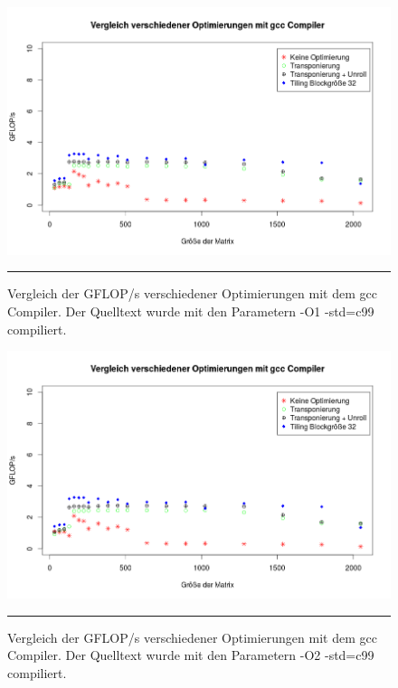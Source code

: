 \begin{figure}[h]
\includegraphics[scale = 0.45]{Bilder/GgccO1.png}
\caption{Vergleich der GFLOP/s verschiedener Optimierungen mit dem gcc Compiler. Der Quelltext wurde mit den Parametern -O1 -std=c99 compiliert.}
\noindent\rule{14cm}{0.4pt}
\label{GgccO1}
\end{figure}

\begin{figure}[h]
\includegraphics[scale = 0.45]{Bilder/GgccO2.png}
\caption{Vergleich der GFLOP/s verschiedener Optimierungen mit dem gcc Compiler. Der Quelltext wurde mit den Parametern -O2 -std=c99 compiliert.}
\noindent\rule{14cm}{0.4pt}
\label{GgccO2}
\end{figure}

